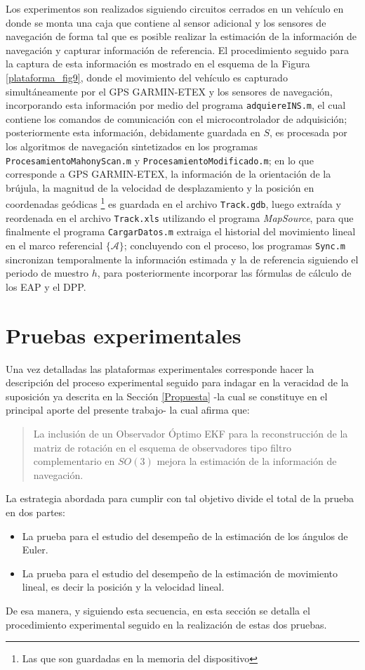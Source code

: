 \documentclass[conference]{IEEEtran}
\newcommand{\marco}[1]{\{\mathcal{#1}\}}
\begin{document}
\begin{enumerate}
Los experimentos son realizados siguiendo circuitos cerrados en un vehículo en donde se monta una caja que contiene al sensor adicional y los sensores de navegación de forma tal que es posible realizar la estimación de la información de navegación y capturar información de referencia. El procedimiento seguido para la captura de esta información es mostrado en el esquema de la Figura \ref{plataforma_fig9}, donde el movimiento del vehículo es capturado simultáneamente por el GPS GARMIN-ETEX y los sensores de navegación, incorporando esta información por medio del programa \texttt{adquiereINS.m}, el cual contiene los comandos de comunicación con el microcontrolador de adquisición; posteriormente esta información, debidamente guardada en $S$, es procesada por los algoritmos de navegación sintetizados en los programas \texttt{ProcesamientoMahonyScan.m} y \texttt{ProcesamientoModificado.m}; en lo que corresponde a GPS GARMIN-ETEX, la información de la orientación de la brújula, la magnitud de la velocidad de desplazamiento y la posición en coordenadas geódicas \footnote{Las que son guardadas en la memoria del dispositivo} es guardada en el archivo \texttt{Track.gdb}, luego extraída y reordenada en el archivo \texttt{Track.xls} utilizando el programa \emph{MapSource}, para que finalmente el programa \texttt{CargarDatos.m} extraiga el historial del movimiento lineal en el marco referencial $\marco{A}$; concluyendo con el proceso, los programas \texttt{Sync.m} sincronizan temporalmente la información estimada y la de referencia siguiendo el periodo de muestro $h$, para posteriormente incorporar las fórmulas de cálculo de los EAP y el DPP.
\end{enumerate}
\section{Pruebas experimentales}
Una vez detalladas las plataformas experimentales corresponde hacer la descripción del proceso experimental seguido para indagar en la veracidad de la suposición ya descrita en la Sección \ref{Propuesta} -la cual se constituye en el principal aporte del presente trabajo- la cual afirma que:
\begin{quote}
La inclusión de un Observador Óptimo EKF para la reconstrucción de la matriz de rotación en el esquema de observadores tipo filtro complementario en $SO(3)$ mejora la estimación de la información de navegación.
\end{quote}
La estrategia abordada para cumplir con tal objetivo divide el total de la prueba en dos partes:
\begin{itemize}
\item La prueba para el estudio del desempeño de la estimación de los ángulos de Euler.
\item La prueba para el estudio del desempeño de la estimación de movimiento lineal, es decir la posición y la velocidad lineal.
\end{itemize}
De esa manera, y siguiendo esta secuencia, en esta sección se detalla el procedimiento experimental seguido en la realización de estas dos pruebas.
\end{document}
